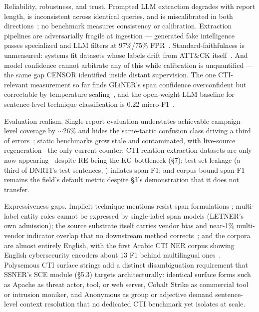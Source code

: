 \documentclass[11pt]{article}
\begin{document}
Reliability, robustness, and trust. Prompted LLM extraction degrades with report length, is inconsistent across identical queries, and is miscalibrated in both directions~\citep{mezzi2025large}; no benchmark measures consistency or calibration. Extraction pipelines are adversarially fragile at ingestion — generated fake intelligence passes specialized and LLM filters at 97\%/75\% FPR~\citep{shafee2025false}. Standard-faithfulness is unmeasured: systems fit datasets whose labels drift from ATT\&CK itself~\citep{meng2025instantiating}. And model confidence cannot arbitrate any of this while calibration is unquantified — the same gap CENSOR identified inside distant supervision. The one CTI-relevant measurement so far finds GLiNER's span confidence overconfident but correctable by temperature scaling~\citep{chaganti2026ondevice}, and the open-weight LLM baseline for sentence-level technique classification is 0.22 micro-F1~\citep{ryan2026evaluating}.

Evaluation realism. Single-report evaluation understates achievable campaign-level coverage by $\sim$26\% and hides the same-tactic confusion class driving a third of errors~\citep{haque2026single}; static benchmarks grow stale and contaminated, with live-source regeneration~\citep{alam2025athenabench} the only current counter; CTI relation-extraction datasets are only now appearing~\citep{oyenuga2026relation,das2026structuring} despite RE being the KG bottleneck (§7); test-set leakage (a third of DNRTI's test sentences, \citealp{mitchell2026lora}) inflates span-F1; and corpus-bound span-F1 remains the field's default metric despite §3's demonstration that it does not transfer.

Expressiveness gaps. Implicit technique mentions resist span formulations \citep{lange2024annoctr}; multi-label entity roles cannot be expressed by single-label span models (LETNER's own admission); the source substrate itself carries vendor bias and near-1\% multi-vendor indicator overlap that no downstream method corrects~\citep{suarezroman2026cti,ethembabaoglu2026apttodisagree}; and the corpora are almost entirely English, with the first Arabic CTI NER corpus showing English cybersecurity encoders about 13 F1 behind multilingual ones~\citep{alghamdi2026aracti}.
Polysemous CTI surface strings add a distinct disambiguation requirement that SSNER's SCE module (§5.3) targets architecturally: identical surface forms such as Apache as threat actor, tool, or web server, Cobalt Strike as commercial tool or intrusion moniker, and Anonymous as group or adjective demand sentence-level context resolution that no dedicated CTI benchmark yet isolates at scale.
\end{document}
